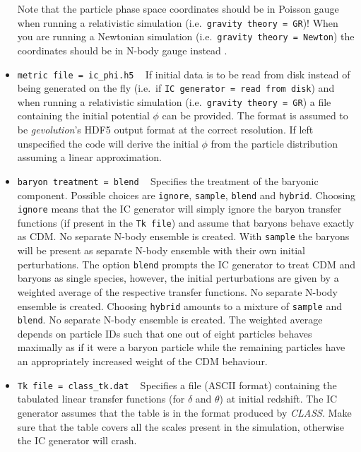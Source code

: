 \documentclass[a4paper,10pt]{article}
\begin{document}
\begin{itemize}
 Note that the particle phase space coordinates should be in Poisson gauge when running a relativistic simulation
 (i.e.\ \texttt{gravity theory = GR})! When you are running a Newtonian simulation (i.e.\ \texttt{gravity theory = Newton}) the
 coordinates should be in N-body gauge instead \cite{Fidler:2015npa}.
 \item[] \hspace{-25pt}\texttt{metric file = ic\_phi.h5} ~ If initial data is to be read from disk instead of being generated on the fly
 (i.e.\ if \texttt{IC~generator~=~read~from~disk}) and when running a relativistic simulation (i.e.\ \texttt{gravity theory = GR}) a file
 containing the initial potential $\mathsf{\phi}$ can be provided. The format is assumed to be \textit{gevolution}'s HDF5 output format
 at the correct resolution. If left unspecified the code will derive the initial $\mathsf{\phi}$ from the particle distribution assuming
 a linear approximation.
 \item[] \hspace{-25pt}\texttt{baryon treatment = blend} ~ Specifies the treatment of the baryonic component. Possible choices are
 \texttt{ignore}, \texttt{sample}, \texttt{blend} and \texttt{hybrid}. Choosing \texttt{ignore} means that the IC generator will simply
 ignore the baryon transfer functions (if present in the \texttt{Tk file}) and assume that baryons behave exactly as CDM. No separate N-body
 ensemble is created. With \texttt{sample} the baryons will be present as separate N-body ensemble with their own initial perturbations.
 The option \texttt{blend} prompts the IC generator to treat CDM and baryons as single species, however, the initial perturbations are given
 by a weighted average of the respective transfer functions. No separate N-body ensemble is created. Choosing \texttt{hybrid} amounts to a
 mixture of \texttt{sample} and \texttt{blend}. No separate N-body ensemble is created. The weighted average depends on particle IDs such
 that one out of eight particles behaves maximally as if it were a baryon particle while the remaining particles have an appropriately
 increased weight of the CDM behaviour.
 \item[] \hspace{-25pt}\texttt{Tk file = class\_tk.dat} ~ Specifies a file (ASCII format) containing the tabulated linear transfer functions
 (for $\mathsf{\delta}$ and $\mathsf{\theta}$) at initial redshift. The IC generator assumes that the table is in the format produced by
 \textit{CLASS}. Make sure that the table covers all the scales present in the simulation, otherwise the IC generator will crash.
 

\end{itemize}
\end{document}
